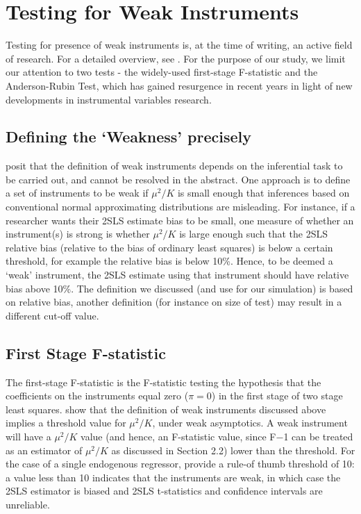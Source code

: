 \section{Testing for Weak Instruments}
Testing for presence of weak instruments is, at the time of writing, an active field of research. For a detailed overview, see \cite{stock2002survey}. For the purpose of our study, we limit our attention to two tests - the widely-used first-stage F-statistic and the Anderson-Rubin Test, which has gained resurgence in recent years in light of new developments in instrumental variables research. 

\subsection{Defining the `Weakness' precisely}
\cite{stock2002testing} posit that the definition of weak instruments depends on the inferential task to be carried out, and cannot be resolved in the abstract. One approach is to define a set of instruments to be weak if $\mu^2/K$
is small enough that inferences based on conventional normal
approximating distributions are misleading. For instance, if a researcher wants their 2SLS estimate bias to be small, one measure
of whether an instrument(s) is strong is whether $\mu^2/K$ is
large enough such that the 2SLS relative bias (relative to the bias of ordinary least squares) is below a certain threshold, for example the relative bias is below 10\%. Hence, to be deemed a `weak' instrument, the 2SLS estimate using that instrument should have relative bias above 10\%. The definition we discussed (and use for our simulation) is based on relative bias, another definition (for instance on size of test) may result in a different cut-off value.


\subsection{First Stage F-statistic}
The first-stage F-statistic is the F-statistic testing the hypothesis that the coefficients on the instruments equal zero ($\pi=0$) in the first stage of two stage least squares. 
\cite{stock2002testing} show that the definition of weak instruments discussed above implies a threshold value for $\mu^2/K$, under weak asymptotics. A weak instrument will have a $\mu^2/K$ value (and hence, an F-statistic value, since F$-$1 can be treated as an estimator of $\mu^2/K$ as discussed in Section 2.2) lower than the threshold.
For the case of a single endogenous regressor, \cite{staiger1997stock} provide a rule-of thumb threshold of 10: a value less than 10 indicates that the instruments are weak, in which case the 2SLS estimator is biased and 2SLS t-statistics and confidence intervals are unreliable.

